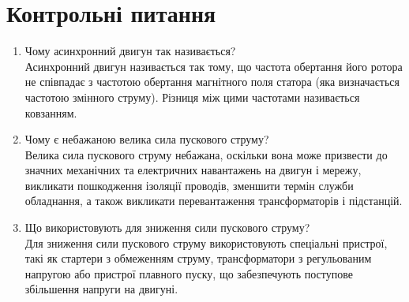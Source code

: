 \documentclass[a4paper]{article}
\begin{document}
\section*{Контрольні питання}
\begin{enumerate}
    \item Чому асинхронний двигун так називається? \\
    Асинхронний двигун називається так тому, що частота обертання його ротора не співпадає з частотою обертання магнітного поля статора (яка визначається частотою змінного струму). Різниця між цими частотами називається ковзанням.
    
    \item Чому є небажаною велика сила пускового струму? \\
    Велика сила пускового струму небажана, оскільки вона може призвести до значних механічних та електричних навантажень на двигун і мережу, викликати пошкодження ізоляції проводів, зменшити термін служби обладнання, а також викликати перевантаження трансформаторів і підстанцій.
    
    \item Що використовують для зниження сили пускового струму? \\
    Для зниження сили пускового струму використовують спеціальні пристрої, такі як стартери з обмеженням струму, трансформатори з регульованим напругою або пристрої плавного пуску, що забезпечують поступове збільшення напруги на двигуні.
\end{enumerate}
\end{document}

